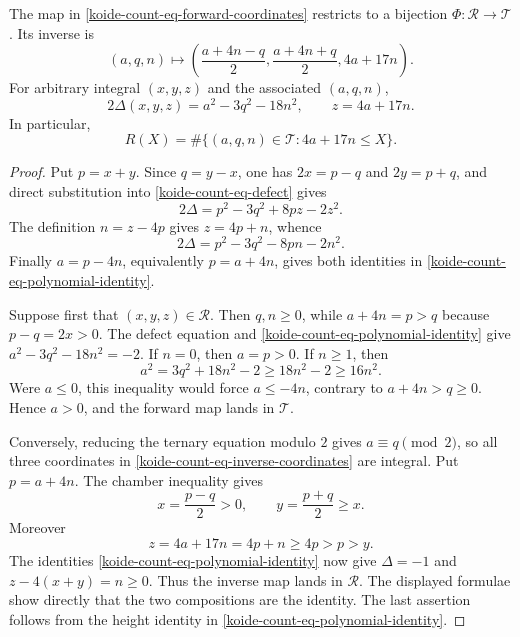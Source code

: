 \begin{theorem}
\label{koide-count-thm-coordinate-bijection}
The map in \eqref{koide-count-eq-forward-coordinates} restricts to a
bijection \(\Phi:\mathcal R\to\mathcal T\).  Its inverse is
\begin{equation}
 (a,q,n)\longmapsto
 \left(
 \frac{a+4n-q}{2},
 \frac{a+4n+q}{2},
 4a+17n
 \right).
 \label{koide-count-eq-inverse-coordinates}
\end{equation}
For arbitrary integral \((x,y,z)\) and the associated \((a,q,n)\),
\begin{equation}
 2\Delta(x,y,z)=a^2-3q^2-18n^2,
 \qquad z=4a+17n.
 \label{koide-count-eq-polynomial-identity}
\end{equation}
In particular,
\begin{equation}
 R(X)=\#\{(a,q,n)\in\mathcal T:4a+17n\leq X\}.
 \label{koide-count-eq-exact-count}
\end{equation}
\end{theorem}

\begin{proof}
Put \(p=x+y\).  Since \(q=y-x\), one has
\(2x=p-q\) and \(2y=p+q\), and direct substitution into
\eqref{koide-count-eq-defect} gives
\[
 2\Delta=p^2-3q^2+8pz-2z^2.
\]
The definition \(n=z-4p\) gives \(z=4p+n\), whence
\[
 2\Delta=p^2-3q^2-8pn-2n^2.
\]
Finally \(a=p-4n\), equivalently \(p=a+4n\), gives both identities in
\eqref{koide-count-eq-polynomial-identity}.

Suppose first that \((x,y,z)\in\mathcal R\).  Then \(q,n\geq0\), while
\(a+4n=p>q\) because \(p-q=2x>0\).  The defect equation and
\eqref{koide-count-eq-polynomial-identity} give
\(a^2-3q^2-18n^2=-2\).  If \(n=0\), then \(a=p>0\).  If \(n\geq1\),
then
\[
 a^2=3q^2+18n^2-2\geq18n^2-2\geq16n^2.
\]
Were \(a\leq0\), this inequality would force \(a\leq-4n\), contrary to
\(a+4n>q\geq0\).  Hence \(a>0\), and the forward map lands in
\(\mathcal T\).

Conversely, reducing the ternary equation modulo \(2\) gives
\(a\equiv q\pmod2\), so all three coordinates in
\eqref{koide-count-eq-inverse-coordinates} are integral.  Put
\(p=a+4n\).  The chamber inequality gives
\[
 x=\frac{p-q}{2}>0,\qquad
 y=\frac{p+q}{2}\geq x.
\]
Moreover
\[
 z=4a+17n=4p+n\geq4p>p>y.
\]
The identities \eqref{koide-count-eq-polynomial-identity} now give
\(\Delta=-1\) and \(z-4(x+y)=n\geq0\).  Thus the inverse map lands in
\(\mathcal R\).  The displayed formulae show directly that the two
compositions are the identity.  The last assertion follows from the height
identity in \eqref{koide-count-eq-polynomial-identity}.
\end{proof}

